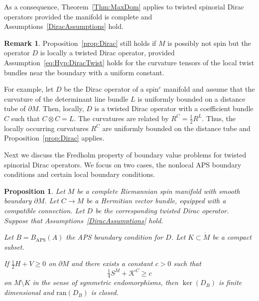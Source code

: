 \documentclass[a4paper,10pt,reqno]{amsart}
\newcommand{\interior}[1]{\mathring{#1}}
\newcommand{\ran}{\mathrm{ran}}
\newcommand{\KK}{\mathscr{K}}
\newcommand{\APS}{\mathrm{APS}}
\newcommand{\dM}{\partial M}
\newtheorem{proposition}[theorem]{Proposition}
\theoremstyle{definition}
\newtheorem{remark}[theorem]{Remark}
\begin{document}
As a consequence, Theorem~\ref{Thm:MaxDom} applies to twisted spinorial Dirac operators provided the manifold is complete and Assumptions~\ref{DiracAssumptions} hold.

\begin{remark}
Proposition~\ref{prop:Dirac} still holds if $M$ is possibly not spin but the operator $D$ is locally a twisted Dirac operator, provided Assumption~\ref{eq:Hyp:DiracTwist} holds for the curvature tensors of the local twist bundles near the boundary with a uniform constant.

For example, let $D$ be the Dirac operator of a spin$^c$ manifold and assume that the curvature of the determinant line bundle $L$ is uniformly bounded on a distance tube of $\dM$.
Then, locally, $D$ is a twisted Dirac operator with a coefficient bundle $C$ such that $C\otimes C=L$.
The curvatures are related by $R^C=\frac12 R^L$.
Thus, the locally occurring curvatures $R^C$ are uniformly bounded on the distance tube and Proposition~\ref{prop:Dirac} applies.
\end{remark}

Next we discuss the Fredholm property of boundary value problems for twisted spinorial Dirac operators.
We focus on two cases, the nonlocal APS boundary conditions and certain local boundary conditions.


\begin{proposition}\label{Prop:DiracBVP}
Let $M$ be a complete Riemannian spin manifold with smooth boundary $\dM$.
Let $C\to M$ be a Hermitian vector bundle, equipped with a compatible connection.
Let $D$ be the corresponding twisted Dirac operator.
Suppose that Assumptions~\ref{DiracAssumptions} hold.

Let $B=B_{\APS}(A)$ the APS boundary condition for $D$.
Let $K\subset \interior{M}$ be a compact subset.


If $\frac12 H+V\ge0$ on $\dM$ and there exists a constant $c>0$ such that
$$
\tfrac14 S^M + \KK^C \ge c
$$
on $M\setminus K$ in the sense of symmetric endomorphisms, then $\ker(D_B)$ is finite dimensional and $\ran(D_B)$ is closed.
\end{proposition}
\end{document}
